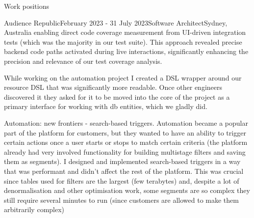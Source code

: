 \documentclass{resume} %
\begin{document}
\begin{rSection}{Work positions}
\begin{rSubsection}{Audience Republic}{February 2023 - 31 July 2023}{Software Architect}{Sydney, Australia}
    enabling direct code coverage measurement from UI-driven integration tests (which was the majority in our test suite).
    This approach revealed precise backend code paths activated during live interactions, significantly enhancing the precision and
    relevance of our test coverage analysis.
\item While working on the automation project I created a DSL wrapper
    around our resource DSL that was significantly more readable.
    Once other engineers discovered it they asked for it to be moved into the core of the project as a primary interface for working
    with db entities, which we gladly did.
\item Automation: new frontiers - search-based triggers. Automation became
    a popular part of the platform for customers, but they wanted
    to have an ability to trigger certain actions once a user starts or stops to match certain criteria (the platform already had very
    involved functionality for building multistage filters and saving them as segments). I designed and implemented search-based triggers
    in a way that was performant and didn't affect the rest of the platform. This was crucial since tables used for filters are the
    largest (few terabytes) and, despite a lot of denormalisation and other optimisation work, some segments are so complex they still require 
    several minutes to run (since customers are allowed to make them arbitrarily complex)
~
\end{rSubsection}


\end{rSection}
\end{document}
